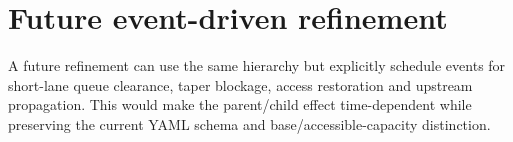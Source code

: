 \section{Future event-driven refinement}
A future refinement can use the same hierarchy but explicitly schedule events for
short-lane queue clearance, taper blockage, access restoration and upstream propagation.
This would make the parent/child effect time-dependent while preserving the current YAML
schema and base/accessible-capacity distinction.
